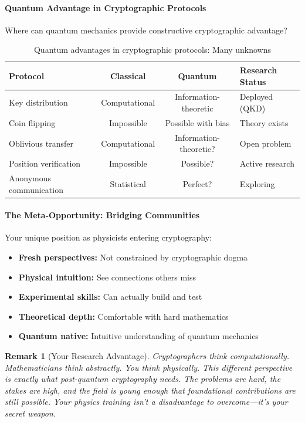 \documentclass[11pt,a4paper]{article}
\newtheorem{remark}{Remark}
\begin{document}
\paragraph{Quantum Advantage in Cryptographic Protocols}

Where can quantum mechanics provide constructive cryptographic advantage?

\begin{table}[h]
\centering
\begin{tabular}{|l|c|c|l|}
\hline
\textbf{Protocol} & \textbf{Classical} & \textbf{Quantum} & \textbf{Research Status} \\
\hline
Key distribution & Computational & Information-theoretic & Deployed (QKD) \\
Coin flipping & Impossible & Possible with bias & Theory exists \\
Oblivious transfer & Computational & Information-theoretic? & Open problem \\
Position verification & Impossible & Possible? & Active research \\
Anonymous communication & Statistical & Perfect? & Exploring \\
\hline
\end{tabular}
\caption{Quantum advantages in cryptographic protocols: Many unknowns}
\end{table}

\paragraph{The Meta-Opportunity: Bridging Communities}

Your unique position as physicists entering cryptography:
\begin{itemize}
    \item \textbf{Fresh perspectives:} Not constrained by cryptographic dogma
    \item \textbf{Physical intuition:} See connections others miss
    \item \textbf{Experimental skills:} Can actually build and test
    \item \textbf{Theoretical depth:} Comfortable with hard mathematics
    \item \textbf{Quantum native:} Intuitive understanding of quantum mechanics
\end{itemize}

\begin{remark}[Your Research Advantage]
Cryptographers think computationally. Mathematicians think abstractly. You think physically. This different perspective is exactly what post-quantum cryptography needs. The problems are hard, the stakes are high, and the field is young enough that foundational contributions are still possible. Your physics training isn't a disadvantage to overcome—it's your secret weapon.
\end{remark}
\end{document}
